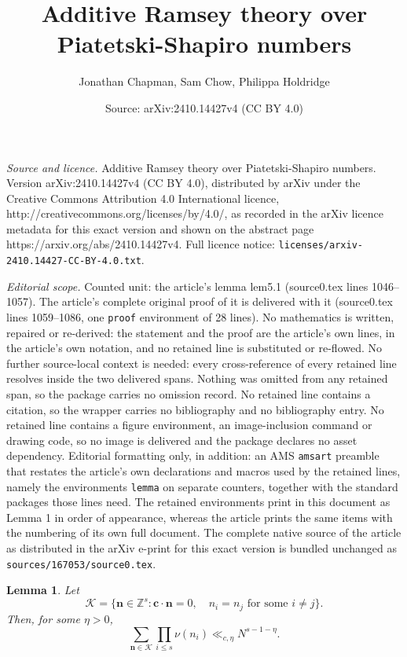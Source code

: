 \documentclass[10pt,a4paper]{amsart}
\title{Additive Ramsey theory over Piatetski-Shapiro numbers}
\author{Jonathan Chapman, Sam Chow, Philippa Holdridge}
\date{Source: arXiv:2410.14427v4 (CC BY 4.0)}
\newtheorem{lemma}{Lemma}
\def \bZ {\mathbb Z}
\def \bc {\mathbf c}
\def \bn {{\mathbf{n}}}
\def \cK {\mathcal K}
\def\le{\leqslant} \def\ge{\geqslant} \def\pleq{\preccurlyeq} \def\ple{\prec}
\begin{document}
\maketitle

\noindent\emph{Source and licence.} Additive Ramsey theory over Piatetski-Shapiro numbers. Version arXiv:2410.14427v4 (CC BY 4.0), distributed by arXiv under the Creative Commons Attribution 4.0 International licence, http://creativecommons.org/licenses/by/4.0/, as recorded in the arXiv licence metadata for this exact version and shown on the abstract page https://arxiv.org/abs/2410.14427v4. Full licence notice: \texttt{licenses/arxiv-2410.14427-CC-BY-4.0.txt}.\par\smallskip

\noindent\textit{Editorial scope.} Counted unit: the article's lemma lem5.1 (source0.tex lines 1046--1057). The article's complete original proof of it is delivered with it (source0.tex lines 1059--1086, one \texttt{proof} environment of 28 lines). No mathematics is written, repaired or re-derived: the statement and the proof are the article's own lines, in the article's own notation, and no retained line is substituted or re-flowed.  No further source-local context is needed: every cross-reference of every retained line resolves inside the two delivered spans.  Nothing was omitted from any retained span, so the package carries no omission record.  No retained line contains a citation, so the wrapper carries no bibliography and no bibliography entry.  No retained line contains a figure environment, an image-inclusion command or drawing code, so no image is delivered and the package declares no asset dependency.  Editorial formatting only, in addition: an AMS \texttt{amsart} preamble that restates the article's own declarations and macros used by the retained lines, namely the environments \texttt{lemma} on separate counters, together with the standard packages those lines need.  The retained environments print in this document as Lemma 1 in order of appearance, whereas the article prints the same items with the numbering of its own full document.  The complete native source of the article as distributed in the arXiv e-print for this exact version is bundled unchanged as \texttt{sources/167053/source0.tex}.
\begin{lemma} 
\label{lem5.1}
Let
\[
\cK = \{ \bn \in \bZ^s: \bc \cdot \bn = 0, \quad
n_i = n_j \text{ for some } i \ne j \}.
\]
Then, for some $\eta > 0$,
\[
\sum_{\bn \in \cK} \prod_{i\le s} \nu(n_i) \ll_{c,\eta} N^{s - 1 - \eta}.
\]
\end{lemma}
\end{document}
